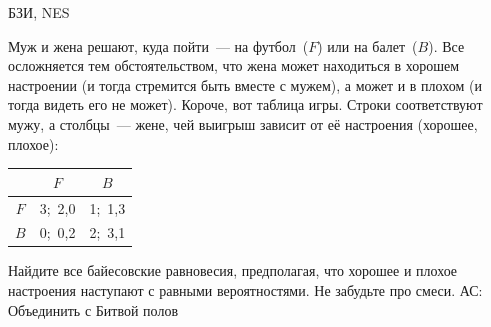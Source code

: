 \begin{problem}
\begin{source}
БЗИ, NES
\end{source} Муж и жена решают, куда пойти~— на
футбол~($F$) или на балет~($B$). Все осложняется тем
обстоятельством, что жена может находиться в хорошем
настроении (и тогда стремится быть вместе с мужем), а может
и в плохом (и тогда видеть его не может). Короче, вот
таблица игры. Строки соответствуют мужу, а столбцы~—
жене, чей выигрыш зависит от её настроения (хорошее, плохое):
\begin{center}
\begin{tabular}{|c|cc|}
\hline &$F$&$B$\\ \hline $F$&3;\ 2,0&1;\ 1,3\\ $B$&0;\
0,2&2;\ 3,1\\ \hline
\end{tabular}
\end{center}

 Найдите все байесовские равновесия, предполагая, что хорошее и плохое
настроения  наступают с равными вероятностями. Не
забудьте про смеси.
{\red АС: Объединить с Битвой полов}
\begin{sol}

\end{sol}
\end{problem}



